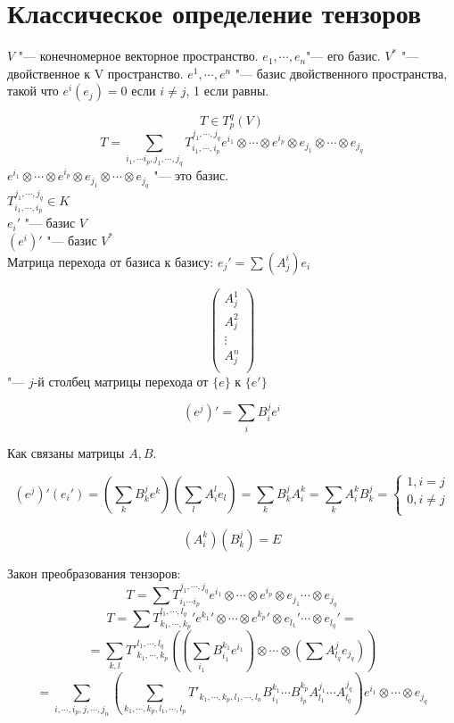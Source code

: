 ﻿\section{Классическое определение тензоров}
$V$ "--- конечномерное векторное пространство. 
$e_1, \cdots, e_n$"--- его базис.
$V^*$ "--- двойственное к V пространство. 
$e^1, \cdots, e^n$ "--- базис двойственного пространства, такой что $e^i(e_j) = 0$  если $i \ne j$, 1 если равны. 

$$T \in T_{p}^q(V)$$
$$T = \sum_{i_1, \cdots i_p, j_1, \cdots, j_q} T_{i_1, \cdots, i_p}^{j_1, \cdots, j_q} e^{i_1} \otimes \cdots \otimes e^{i_p} \otimes e_{j_1} \otimes \cdots \otimes e_{j_q}$$ 
$e^{i_1} \otimes \cdots \otimes e^{i_p} \otimes e_{j_1} \otimes \cdots \otimes e_{j_q}$ "--- это базис.\\
$T_{i_1, \cdots, i_p}^{j_1, \cdots, j_q} \in K$\\

$e_i'$ "--- базис $V$\\
$(e^i)'$ "--- базис $V^*$\\

Матрица перехода от базиса к базису: $e_j' = \sum(A_j^i)e_i$

$$\begin{pmatrix}
A^1_j\\
A^2_j\\
\vdots\\
A^n_j\\
\end{pmatrix}$$
"--- $j$-й столбец матрицы перехода от $\{e\}$ к $\{e'\}$

$$(e^j)' = \sum_{i}B^{j}_ie^i$$

Как связаны матрицы $A, B$.

$$(e^j)'(e_i') = (\sum_k B_{k}^je^k)(\sum_{l}A_{i}^le_l) = \sum_k B_{k}^j A_{i}^k = \sum_k A_i^kB_k^j = \left\{
\begin{aligned} 1, i = j\\ 
0, i \ne j\\
\end{aligned}
\right.$$

$$(A_i^k)(B_k^j) = E$$

Закон преобразования тензоров: 
$$T = \sum T_{i_1 \cdots i_p}^{j_1, \cdots, j_q}e^{i_1} \otimes \cdots \otimes e^{i_p} \otimes e_{j_1} \cdots \otimes e_{j_q}$$
$$T = \sum {T_{k_1, \cdots, k_p}^{l_1, \cdots, l_q}}'{e^{k_1}}' \otimes \cdots \otimes {e^{k_p}}' \otimes {e_{l_1}}' \cdots \otimes {e_{l_q}}' = $$
$$= \sum_{k,l}T'^{l_1, \cdots, l_q}_{k_1, \cdots, k_p}((\sum_{i_1}B_{i_1}^{k_1}e^{i_1}) \otimes \cdots \otimes (\sum A_{l_q}^{j}e_{j_q}))$$
$$=\sum_{i, \cdots, i_p, j,\cdots, j_n} (\sum_{k_1,\cdots, k_p, l_1, \cdots, l_p}T'_{k_1, \cdots, k_p, l_1, \cdots, l_n}B_{i_1}^{k_1} \cdots B_{i_p}^{k_p}A_{l_1}^{j_1} \cdots A_{l_q}^{j_q})e^{i_1} \otimes \cdots \otimes e_{j_q}$$

